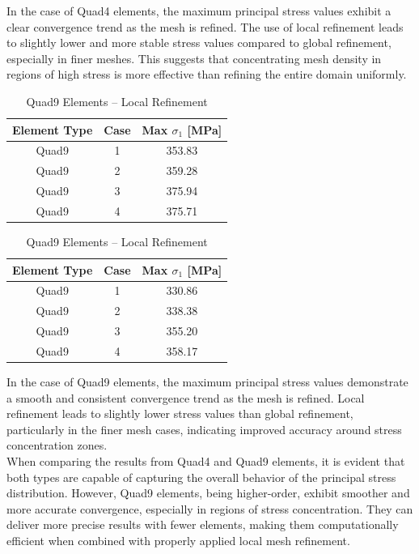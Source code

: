 \documentclass[12pt]{article}
\begin{document}
In the case of Quad4 elements, the maximum principal stress values exhibit a clear convergence trend as the mesh is refined. The use of local refinement leads to slightly lower and more stable stress values compared to global refinement, especially in finer meshes. This suggests that concentrating mesh density in regions of high stress is more effective than refining the entire domain uniformly.

\begin{table}[H]
\centering
\begin{minipage}{0.48\textwidth}
\centering
\begin{tabular}{|c|c|c|}
\hline
\textbf{Element Type} & \textbf{Case} & \textbf{Max $\sigma_1$ [MPa]} \\
\hline
Quad9 & 1 & 353.83 \\
Quad9 & 2 & 359.28 \\
Quad9 & 3 & 375.94 \\
Quad9 & 4 & 375.71 \\
\hline
\end{tabular}
\caption{Quad9 Elements – Global Refinement}
\label{tab:quad9_global}
\end{minipage}
\hfill
\begin{minipage}{0.48\textwidth}
\centering
\begin{tabular}{|c|c|c|}
\hline
\textbf{Element Type} & \textbf{Case} & \textbf{Max $\sigma_1$ [MPa]} \\
\hline
Quad9 & 1 & 330.86 \\
Quad9 & 2 & 338.38 \\
Quad9 & 3 & 355.20 \\
Quad9 & 4 & 358.17 \\
\hline
\end{tabular}
\caption{Quad9 Elements – Local Refinement}
\label{tab:quad9_local}
\end{minipage}
\end{table}

In the case of Quad9 elements, the maximum principal stress values demonstrate a smooth and consistent convergence trend as the mesh is refined. Local refinement leads to slightly lower stress values than global refinement, particularly in the finer mesh cases, indicating improved accuracy around stress concentration zones.
\\
When comparing the results from Quad4 and Quad9 elements, it is evident that both types are capable of capturing the overall behavior of the principal stress distribution. However, Quad9 elements, being higher-order, exhibit smoother and more accurate convergence, especially in regions of stress concentration. They can deliver more precise results with fewer elements, making them computationally efficient when combined with properly applied local mesh refinement.
\end{document}
